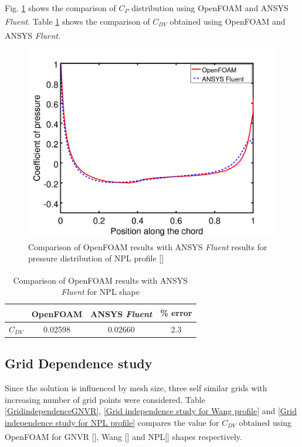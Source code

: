Fig. \ref{NPL fig} shows the comparison of $ C_{P} $ distribution using OpenFOAM\textsuperscript{\textregistered} and ANSYS\textsuperscript{\textregistered} \textit{Fluent}. Table \ref{NPL table} shows the comparison of $ C_{DV} $ obtained using OpenFOAM\textsuperscript{\textregistered} and ANSYS\textsuperscript{\textregistered} \textit{Fluent}.
\begin{figure}[H]
	\centering
	\includegraphics[width=300 pt]{rnd/NPL_cp.png}
	\caption{Comparison of OpenFOAM\textsuperscript{\textregistered} results with ANSYS\textsuperscript{\textregistered} \textit{Fluent} results for pressure distribution of NPL profile []}
	\label{NPL fig} %
\end{figure} 




\begin{table} [H]
	\centering
	\caption{\label{NPL table} Comparison of OpenFOAM\textsuperscript{\textregistered} results with ANSYS\textsuperscript{\textregistered} \textit{Fluent} for NPL shape}
	\begin{tabular}{cccc}
		\hline \hline
		& OpenFOAM\textsuperscript{\textregistered} & ANSYS\textsuperscript{\textregistered} \textit{Fluent} & \% error \\ \hline \hline
		
		$ C_{DV} $ & 0.02598 & 0.02660 & 2.3    \\   \hline
	\end{tabular}
\end{table}
\subsection{Grid Dependence study}
Since the solution is influenced by mesh size, three self similar grids with increasing number of grid points were considered. Table \ref{GridindependenceGNVR}, \ref{Grid independence study for Wang profile} and \ref{Grid independence study for NPL profile} compares the value for $C_{DV}$ obtained using OpenFOAM\textsuperscript{\textregistered} for GNVR [], Wang [] and NPL[] shapes respectively.

